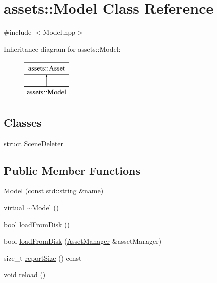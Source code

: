\hypertarget{classassets_1_1Model}{\section{assets\-:\-:Model Class Reference}
\label{classassets_1_1Model}
}


{\ttfamily \#include $<$Model.\-hpp$>$}

Inheritance diagram for assets\-:\-:Model\-:\begin{figure}[H]
\begin{center}
\leavevmode
\includegraphics[height=2.000000cm]{classassets_1_1Model}
\end{center}
\end{figure}
\subsection*{Classes}
\begin{DoxyCompactItemize}
\item 
struct \hyperlink{structassets_1_1Model_1_1SceneDeleter}{Scene\-Deleter}
\end{DoxyCompactItemize}
\subsection*{Public Member Functions}
\begin{DoxyCompactItemize}
\item 
\hyperlink{classassets_1_1Model_a1bbae4ab6fd72ad0ad0d592fcb8dccfa}{Model} (const std\-::string \&\hyperlink{classassets_1_1Asset_a57fe90e1aa9281f2dd59041dffcc74b4}{name})
\item 
virtual \hyperlink{classassets_1_1Model_a915930c25799cf4fb87e75ab5ad411fc}{$\sim$\-Model} ()
\item 
bool \hyperlink{classassets_1_1Model_aebdbb73f8c90792601f5cbd99185086e}{load\-From\-Disk} ()
\item 
bool \hyperlink{classassets_1_1Model_a6362c8d6b52851909fd3503948b264e5}{load\-From\-Disk} (\hyperlink{classassets_1_1AssetManager}{Asset\-Manager} \&asset\-Manager)
\item 
size\-\_\-t \hyperlink{classassets_1_1Model_af553ea8e73bfb59cb391f2d4176df8df}{report\-Size} () const 
\item 
void \hyperlink{classassets_1_1Model_ab5119fd6469968fbee397213e467d174}{reload} ()
\end{DoxyCompactItemize}
